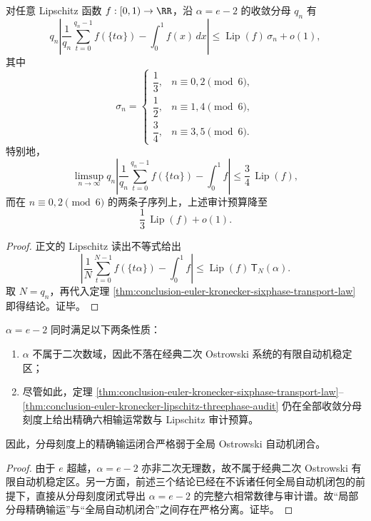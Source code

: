 \begin{theorem}\label{thm:conclusion-euler-kronecker-lipschitz-threephase-audit}
对任意 Lipschitz 函数 \(f:[0,1)\to\RR\)，沿 \(\alpha=e-2\) 的收敛分母 \(q_n\) 有
\[
q_n\left|
\frac1{q_n}\sum_{t=0}^{q_n-1}f(\{t\alpha\})
-\int_0^1 f(x)\,dx
\right|
\le
\operatorname{Lip}(f)\,\sigma_n+o(1),
\]
其中
\[
\sigma_n=
\begin{cases}
\dfrac13,& n\equiv 0,2 \pmod 6,\\[4pt]
\dfrac12,& n\equiv 1,4 \pmod 6,\\[4pt]
\dfrac34,& n\equiv 3,5 \pmod 6.
\end{cases}
\]
特别地，
\[
\limsup_{n\to\infty}
q_n\left|
\frac1{q_n}\sum_{t=0}^{q_n-1}f(\{t\alpha\})-\int_0^1 f
\right|
\le
\frac34\,\operatorname{Lip}(f),
\]
而在 \(n\equiv0,2\pmod6\) 的两条子序列上，上述审计预算降至
\[
\frac13\,\operatorname{Lip}(f)+o(1).
\]
\end{theorem}
\begin{proof}
正文的 Lipschitz 读出不等式给出
\[
\left|
\frac1N\sum_{t=0}^{N-1}f(\{t\alpha\})-\int_0^1 f
\right|
\le
\operatorname{Lip}(f)\,\mathsf T_N(\alpha).
\]
取 \(N=q_n\)，再代入定理 \ref{thm:conclusion-euler-kronecker-sixphase-transport-law} 即得结论。证毕。
\end{proof}

\begin{proposition}[局部精确性与全局非自动性的严格分离]\label{prop:conclusion-euler-kronecker-local-exact-global-nonautomatic}
\(\alpha=e-2\) 同时满足以下两条性质：
\begin{enumerate}
\item \(\alpha\) 不属于二次数域，因此不落在经典二次 Ostrowski 系统的有限自动机稳定区；
\item 尽管如此，定理 \ref{thm:conclusion-euler-kronecker-sixphase-transport-law}--\ref{thm:conclusion-euler-kronecker-lipschitz-threephase-audit} 仍在全部收敛分母刻度上给出精确六相输运常数与 Lipschitz 审计预算。
\end{enumerate}
因此，分母刻度上的精确输运闭合严格弱于全局 Ostrowski 自动机闭合。
\end{proposition}
\begin{proof}
由于 \(e\) 超越，\(\alpha=e-2\) 亦非二次无理数，故不属于经典二次 Ostrowski 有限自动机稳定区。另一方面，前述三个结论已经在不诉诸任何全局自动机闭包的前提下，直接从分母刻度闭式导出 \(\alpha=e-2\) 的完整六相常数律与审计谱。故“局部分母精确输运”与“全局自动机闭合”之间存在严格分离。证毕。
\end{proof}

